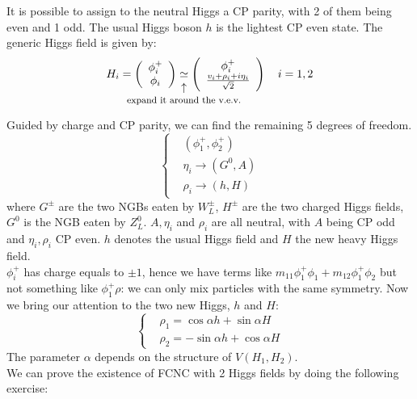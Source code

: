 \documentclass[../main.tex]{subfiles}
\begin{document}
It is possible to assign to the neutral Higgs a CP parity, with 2 of them being even and 1 odd. The usual Higgs boson $h$ is the lightest CP even state. The generic Higgs field is given by:
\[
H_i=\left(\begin{array}{c}
    \phi_i^+\\
    \phi_i
\end{array}\right)
\underset{\mathclap{\tikz \node {$\uparrow$} node [below=1ex] {\footnotesize expand it around the v.e.v. };}}{\simeq}
\left(\begin{array}{c}
    \phi_i^+\\
    \frac{v_i+\rho_i+i\eta_i}{\sqrt{2}}
\end{array}\right)
\quad
i=1,2
\]
Guided by charge and CP parity, we can find the remaining 5 degrees of freedom.
\[
\left\{
\begin{aligned}
&(\phi_1^+,\phi_2^+)\\
&\eta_i\xrightarrow[]{}(G^0,A)\\
&\rho_i\xrightarrow[]{}(h,H)
\end{aligned}
\right.
\]
where $G^\pm$ are the two NGBs eaten by $W_L^\pm$, $H^\pm$ are the two charged Higgs fields, $G^0$ is the NGB eaten by $Z_L^0$. $A, \eta_i$ and $\rho_i$ are all neutral, with $A$ being CP odd and $\eta_i, \rho_i$ CP even. $h$ denotes the usual Higgs field and $H$ the new heavy Higgs field.\\
$\phi_i^+$ has charge equals to $\pm1$, hence we have terms like $m_{11}\phi_1^+\phi_1+m_{12}\phi_1^+\phi_2$ but not something like $\phi_1^+\rho$: we can only mix particles with the same symmetry. Now we bring our attention to the two new Higgs, $h$ and $H$:
\[
\left\{
\begin{aligned}
&\rho_1=\cos\alpha h+\sin\alpha H\\
&\rho_2=-\sin\alpha h+\cos\alpha H
\end{aligned}
\right.
\]
The parameter $\alpha$ depends on the structure of $V(H_1,H_2)$.\\
We can prove the existence of FCNC with 2 Higgs fields by doing the following exercise:
\end{document}
